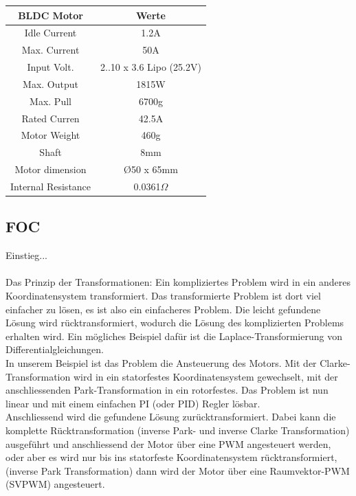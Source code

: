 \begin{center}
\begin{tabular}{|c|c|}
\hline 
\rule[-1ex]{0pt}{2.5ex}  BLDC Motor & Werte  \\ 
\hline 
\rule[-1ex]{0pt}{2.5ex} Idle Current & 1.2A \\ 
\hline 
\rule[-1ex]{0pt}{2.5ex} Max. Current & 50A \\ 
\hline
\rule[-1ex]{0pt}{2.5ex} Input Volt. & 2..10 x 3.6 Lipo (25.2V) \\ 
\hline
\rule[-1ex]{0pt}{2.5ex} Max. Output & 1815W \\ 
\hline
\rule[-1ex]{0pt}{2.5ex} Max. Pull & 6700g \\ 
\hline
\rule[-1ex]{0pt}{2.5ex} Rated Curren & 42.5A \\ 
\hline
\rule[-1ex]{0pt}{2.5ex} Motor Weight & 460g \\ 
\hline
\rule[-1ex]{0pt}{2.5ex} Shaft & 8mm \\ 
\hline
\rule[-1ex]{0pt}{2.5ex} Motor dimension & \O 50 x 65mm \\ 
\hline
\rule[-1ex]{0pt}{2.5ex} Internal Resistance & 0.0361$\Omega$ \\ 
\hline	
\end{tabular} 
\label{tabBLDCdaten}
\end{center}



\subsection{FOC}
\label{tGl_FOC}
Einstieg...\\
\\
Das Prinzip der Transformationen:
Ein kompliziertes Problem wird in ein anderes Koordinatensystem transformiert. Das transformierte Problem ist dort viel einfacher zu lösen, es ist also ein einfacheres Problem. Die leicht gefundene Lösung wird rücktransformiert, wodurch die Lösung des komplizierten Problems erhalten wird. Ein mögliches Beispiel dafür ist die Laplace-Transformierung von Differentialgleichungen. 
\\
In unserem Beispiel ist das Problem die Ansteuerung des Motors. Mit der Clarke-Transformation wird in ein statorfestes Koordinatensystem gewechselt, mit der anschliessenden Park-Transformation in ein rotorfestes. Das Problem ist nun linear und mit einem einfachen PI (oder PID) Regler lösbar. \\
Anschliessend wird die gefundene Lösung zurücktransformiert. Dabei kann die komplette Rücktransformation (inverse Park- und inverse Clarke Transformation) ausgeführt und anschliessend der Motor über eine PWM angesteuert werden, oder aber es wird nur bis ins statorfeste Koordinatensystem rücktransformiert, (inverse Park Transformation) dann wird der Motor über eine Raumvektor-PWM (SVPWM) angesteuert.


